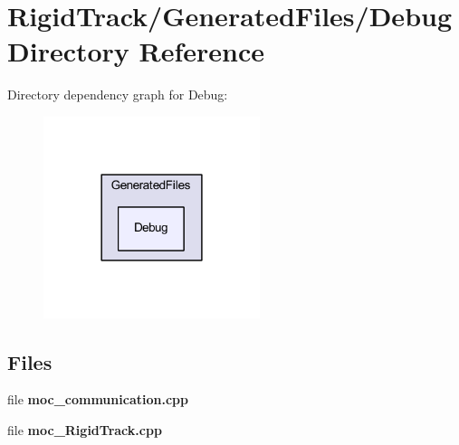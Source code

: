 \section{Rigid\+Track/\+Generated\+Files/\+Debug Directory Reference}
\label{dir_4cbec25b193cc6aada3a738ea0f5ac5b}
Directory dependency graph for Debug\+:\nopagebreak
\begin{figure}[H]
\begin{center}
\leavevmode
\includegraphics[width=179pt]{dir_4cbec25b193cc6aada3a738ea0f5ac5b_dep}
\end{center}
\end{figure}
\subsection*{Files}
\begin{DoxyCompactItemize}
\item 
file \textbf{ moc\+\_\+communication.\+cpp}
\item 
file \textbf{ moc\+\_\+\+Rigid\+Track.\+cpp}
\end{DoxyCompactItemize}
